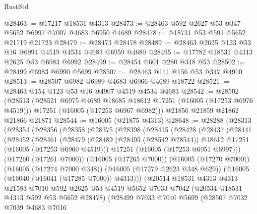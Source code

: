 \begin{lexlean}{RustStd}
\begin{coremodule}
@28463 := @17217 @18531 @4313
@28473 := @28463 @592 @2627 @53 @347 @5652 @6997 @7007 @4683 @6950 @4689
@28478 := @18731 @53 @591 @5652 @21719 @21723
@28479 := @28473 @28478
@28489 := @28463 @2625 @123 @53 @16 @6994 @4519 @4534 @4683 @6959 @4689
@28495 := @17782 @18531 @4313 @2625 @53 @6983 @6992
@28499 := @28454 @601 @280 @348 @53
@28502 := @28499 @6983 @6990 @5699
@28507 := @28463 @141 @156 @53 @347 @4910
@28513 := @28507 @6982 @6989 @4683 @6966 @4689 @18722
@28521 := @28463 @154 @123 @53 @16 @4907 @4519 @4534 @4683
@28542 := @28502
    (@28513
      (@28521 @6975 @4689 @18685 @18612 @17251 (@16005 (@17253 @6976 @4519)))
      @17251
      (@16005 (@17253 @6967 @6982)))
    @21856
    @21859
    @21862
    @21866
    @21871
@28544 := @16005 (@21875 @4313)
@28648 := @28288
    (@28313
      (@28354
        (@28356
          (@28358
            (@28375
              (@28398
                (@28415
                  (@28428
                    (@28437
                      (@28441
                        (@28452
                          (@28461
                            (@28479
                              (@28489
                                (@28495 (@28542 @28544))
                                @18612
                                @17251
                                (@16005 (@17253 @6960 @4519)))
                              @17251
                              (@16005 (@17253 @6951 @6997)))
                            (@17260 (@17261 @7000))
                            (@16005 (@17265 @7000))
                            (@16005 (@17270 @7000))
                            (@16005 (@17274 @7000 @348))
                            (@16005 (@17279 @2623 @348 @629))
                            (@16005 (@16040 (@16041 (@17285 @7000)) @4313)))
                          (@20514
                            @18531
                            @4313
                            @4313
                            @21583
                            @7010
                            @592
                            @2625
                            @53
                            @4519
                            @5652
                            @7033
                            @7042
                            (@20534 @18531 @4313 @592 @53 @5652 @28478)
                            (@28499
                              @7033
                              @7040
                              @5699
                              (@28507
                                @7032
                                @7039
                                @4683
                                @7016

\end{coremodule}
\end{lexlean}
